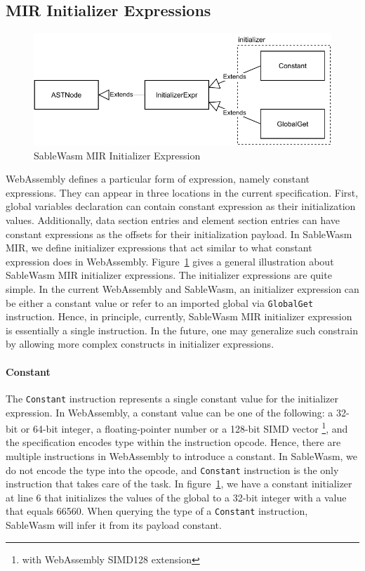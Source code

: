 \subsection{MIR Initializer Expressions}

\begin{figure}
  \centering
  \includegraphics[width=\textwidth]{Images/4.MIR/initalizer-expression.pdf}
  \caption{SableWasm MIR Initializer Expression}
  \label{fig:sablewasm-mir-initializer-expression}
\end{figure}

WebAssembly defines a particular form of expression, namely constant expressions. They can appear in three locations in the current specification. First, global variables declaration can contain constant expression as their initialization values. Additionally, data section entries and element section entries can have constant expressions as the offsets for their initialization payload. In SableWasm MIR, we define initializer expressions that act similar to what constant expression does in WebAssembly. Figure~\ref{fig:sablewasm-mir-initializer-expression} gives a general illustration about SableWasm MIR initializer expressions. The initializer expressions are quite simple. In the current WebAssembly and SableWasm, an initializer expression can be either a constant value or refer to an imported global via \texttt{GlobalGet} instruction. Hence, in principle, currently, SableWasm MIR initializer expression is essentially a single instruction. In the future, one may generalize such constrain by allowing more complex constructs in initializer expressions.

\paragraph{Constant}
The \texttt{Constant} instruction represents a single constant value for the initializer expression. In WebAssembly, a constant value can be one of the following: a 32-bit or 64-bit integer, a floating-pointer number or a 128-bit SIMD vector \footnote{with WebAssembly SIMD128 extension}, and the specification encodes type within the instruction opcode. Hence, there are multiple instructions in WebAssembly to introduce a constant. In SableWasm, we do not encode the type into the opcode, and \texttt{Constant} instruction is the only instruction that takes care of the task. In figure~\ref{fig:sablewasm-mir-initializer-expression}, we have a constant initializer at line 6 that initializes the values of the global to a 32-bit integer with a value that equals 66560. When querying the type of a \texttt{Constant} instruction, SableWasm will infer it from its payload constant.

